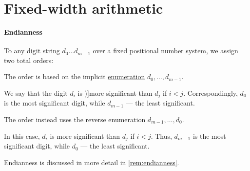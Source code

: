 \section{Fixed-width arithmetic}\label{sec:fixed_width_arithmetic}

\paragraph{Endianness}

\begin{definition}\label{def:endianness}\mimprovised
  To any \hyperref[def:positional_number_system]{digit string} \( d_0 \ldots d_{m-1} \) over a fixed \hyperref[def:positional_number_system]{positional number system}, we assign two total orders:

  \begin{thmenum}
     The  order is based on the implicit \hyperref[def:enumeration]{enumeration} \( d_0, \ldots, d_{m-1} \).

    We say that the digit \( d_i \) is \term[en=more significant (\cite[195]{Knuth1997ArtVol2})]{more significant} than \( d_j \) if \( i < j \). Correspondingly, \( d_0 \) is the most significant digit, while \( d_{m-1} \) --- the least significant.

     The  order instead uses the reverse enumeration \( d_{m-1}, \ldots, d_0 \).

    In this case, \( d_i \) is more significant than \( d_j \) if \( i < j \). Thus, \( d_{m-1} \) is the most significant digit, while \( d_0 \) --- the least significant.
  \end{thmenum}
\end{definition}
\begin{comments}
  \item Endianness is discussed in more detail in \cref{rem:endianness}.
\end{comments}


